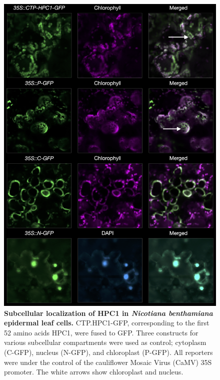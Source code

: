 \begin{figure}[t]
\begin{center}
\includegraphics[width=0.8\linewidth]{Sup_Figures/Sup_Fig_5.png}
\caption[Subcellular localization of HPC1 in \textit{Nicotiana benthamiana} epidermal leaf cells.]{\textbf{Subcellular localization of HPC1 in \textit{Nicotiana benthamiana} epidermal leaf cells.}   
CTP.HPC1-GFP, corresponding to the first 52 amino acids HPC1, were fused to GFP. 
Three constructs for various subcellular compartments were used as control; cytoplasm (C-GFP), nucleus (N-GFP), and chloroplast (P-GFP). All reporters were under the control of the cauliflower Mosaic Virus (CaMV) 35S promoter. The white arrows show chloroplast and nucleus.
} 
\label{figure:Sup:HPC1_organelle}
\end{center}
\end{figure} 
\clearpage

